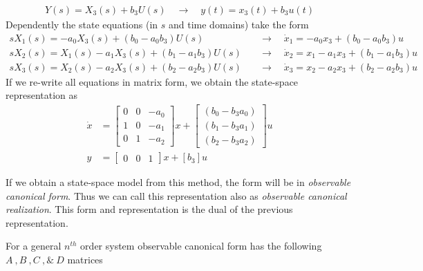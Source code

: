 \documentclass[twoside]{article}
\begin{document}
%
\begin{align*}
	Y(s) = X_3(s) + b_3 U(s) \quad \rightarrow \quad y(t) = x_3(t) + b_3 u(t)
\end{align*}
% 
Dependently the state equations (in $s$ and time domains) take the form
%
%
\begin{align*}
s X_1(s) = -a_0 X_3(s)  + ( b_0 - a_0 b_3) U(s) \quad &\rightarrow \quad \dot{x}_1 = -a_0 x_3  + ( b_0 - a_0 b_3) u
\\
s X_2(s) = X_1(s)  -a_1 X_3(s) + ( b_1 - a_1 b_3 ) U(s)  \quad &\rightarrow \quad \dot{x}_2 = x_1  - a_1 x_3 + ( b_1 - a_1 b_3 ) u
\\
s X_3(s) = X_2(s)  -a_2 X_3(s) + ( b_2 - a_2 b_3 ) U(s)  \quad &\rightarrow \quad \dot{x}_3 = x_2  - a_2 x_3 + ( b_2 - a_2 b_3 ) u
\end{align*}
%
If we re-write all equations in matrix form, we obtain the state-space representation as
%
\begin{align*}
	\dot{x} &= \left[ \begin{array}{ccc} 0 & 0 & -a_0  \\  1 & 0 & -a_1 \\  0 & 1 & -a_2 \end{array} \right] x 
	+ \left[ \begin{array}{c} ( b_0 - b_3 a_0 ) \\ ( b_1 - b_3 a_1 ) \\ ( b_2 - b_3 a_2 ) \end{array} \right] u
	\\
	y &= \left[ \begin{array}{ccc} 0 & 0  & 1 \end{array} \right] x
	+ \left[ b_3 \right] u
\end{align*}

If we obtain a state-space model from this method, the form
will be in \textit{observable canonical form}. Thus we can call this representation also as 
\textit{observable canonical realization}. This form and
representation is the dual of the previous representation. 

For a general $n^{th}$ order system observable
canonical form has the following $A \ ,  B \ ,  C \ , \& \ D$
matrices
\end{document}
